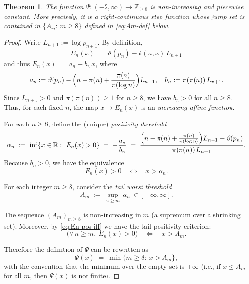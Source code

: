\documentclass[10pt]{amsart}
\newtheorem{theorem}{Theorem}[section]
\theoremstyle{definition} %
\numberwithin{equation}{section}
\begin{document}
\begin{theorem}\label{prop:psi-piecewise-const}
The function $\Psi:(-2,\infty)\to \mathbb{Z}_{\geq 8}$ is
non-increasing and piecewise constant. More precisely, it is a right-continuous step function
whose jump set is contained in $\{A_m:\, m\ge 8\}$ defined in \eqref{eq:Am-def} below.
\end{theorem}

\begin{proof}
Write $L_{n+1}:=\log p_{n+1}$. By definition,
\[
E_n(x)\;=\;\vartheta(p_n)-k(n,x)\,L_{n+1}
\]
and thus $E_n(x)\;=\;a_n+b_n\,x$, where
\begin{equation}\label{eq:En-affine}
a_n:=\vartheta(p_n)-\Bigl(n-\pi(n)+\frac{\pi(n)}{\pi(\log n)}\Bigr)L_{n+1},\quad
b_n:=\pi(\pi(n))\,L_{n+1}.
\end{equation}
Since $L_{n+1}>0$ and $\pi(\pi(n))\ge 1$ for $n\ge 8$, we have $b_n>0$ for all $n\ge 8$.
Thus, for each fixed $n$, the map $x\mapsto E_n(x)$ is an \emph{increasing affine function}.

For each $n\ge 8$, define the (unique) \emph{positivity threshold}
\begin{equation}\label{eq:alpha-n-def}
\alpha_n\;:=\;\inf\{x\in\mathbb{R}:\ E_n(x)>0\}
\;=\;-\frac{a_n}{b_n}
\;=\;\frac{\Bigl(n-\pi(n)+\frac{\pi(n)}{\pi(\log n)}\Bigr)L_{n+1}-\vartheta(p_n)}{\pi(\pi(n))\,L_{n+1}}.
\end{equation}
Because $b_n>0$, we have the equivalence
\begin{equation}\label{eq:En-pos-iff}
E_n(x)>0\quad\Longleftrightarrow\quad x>\alpha_n.
\end{equation}

For each integer $m\ge 8$, consider the \emph{tail worst threshold}
\begin{equation}\label{eq:Am-def}
A_m\;:=\;\sup_{n\ge m}\,\alpha_n\ \in[-\infty,\infty].
\end{equation}

The sequence $(A_m)_{m\ge 8}$ is non-increasing in $m$ (a supremum over a shrinking set).
Moreover, by \eqref{eq:En-pos-iff} we have the tail positivity criterion:
\begin{equation}\label{eq:tail-criterion}
\bigl(\forall\,n\ge m,\ E_n(x)>0\bigr)\quad\Longleftrightarrow\quad x>A_m.
\end{equation}

Therefore the definition of $\Psi$ can be rewritten as
\begin{equation}\label{eq:Psi-by-Am}
\Psi(x)\;=\;\min\bigl\{m\ge 8:\ x>A_m\bigr\},
\end{equation}
with the convention that the minimum over the empty set is $+\infty$ (i.e., if $x\le A_m$ for all $m$,
then $\Psi(x)$ is not finite).


\end{proof}
\end{document}
